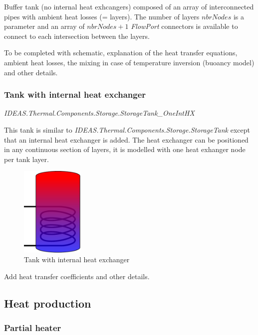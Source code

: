 Buffer tank (no internal heat exhcangers) composed of an array of interconnected pipes with ambient heat losses (= layers).  The number of layers $nbrNodes$ is a parameter and an array of $nbrNodes + 1$ \emph{FlowPort} connectors is available to connect to each intersection between the layers. 

To be completed with schematic, explanation of the heat transfer equations, ambient heat losses, the mixing in case of temperature inversion (buoancy model) and other details.

\subsubsection{Tank with internal heat exchanger}

\emph{IDEAS.Thermal.Components.Storage.StorageTank_OneIntHX}

\vspace{6mm}

This tank is similar to \emph{IDEAS.Thermal.Components.Storage.StorageTank} except that an internal heat exchanger is added.  The heat exchanger can be positioned in any continuous section of layers, it is modelled with one heat exhanger node per tank layer. 

\begin{figure}%
\begin{left}
\includegraphics[width=3cm]{Thermal/images/HydraulicScheme.pdf}%
\caption{Tank with internal heat exchanger}%
\label{tankinternal}%
\end{left}
\end{figure}

Add heat transfer coefficients and other details.

\subsection{Heat production}

\subsubsection{Partial heater}

